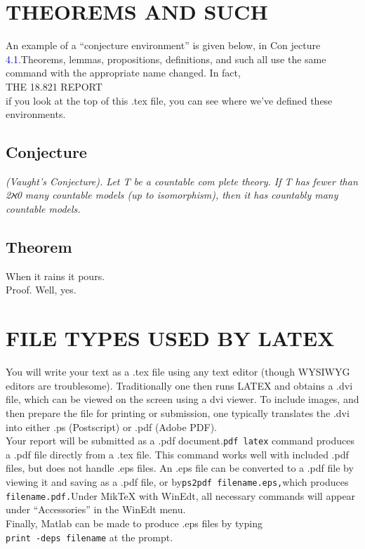 \documentclass{article}
\begin{document}
	\section{\small THEOREMS AND SUCH}
	An example of a “conjecture environment” is given below, in Con­
	jecture \textcolor{blue}{4.1}.Theorems, lemmas, propositions, deﬁnitions, and such all
	use the same command with the appropriate name changed. In fact,
	\centering\\
	THE 18.821 REPORT\\
	\vspace{0.5cm}
	if you look at the top of this .tex ﬁle, you can see where we’ve deﬁned
	these environments.
	\subsection{Conjecture} \textit{(Vaught’s Conjecture). Let T be a countable com­
		plete theory. If T has fewer than 2ℵ0 many countable models (up to
		isomorphism), then it has countably many countable models.}
	\subsection{Theorem}When it rains it pours.\\
	Proof. Well, yes.
	\section{\small FILE TYPES USED BY LATEX}
	You will write your text as a .tex ﬁle using any text editor (though
	WYSIWYG editors are troublesome). Traditionally one then runs
	LATEX and obtains a .dvi ﬁle, which can be viewed on the screen using a
	dvi viewer. To include images, and then prepare the ﬁle for printing or
	submission, one typically translates the .dvi into either .ps (Postscript)
	or .pdf (Adobe PDF).\\
	Your report will be submitted as a .pdf document.\texttt{pdf latex} command produces a .pdf ﬁle directly from a .tex ﬁle. This command
	works well with included .pdf ﬁles, but does not handle .eps ﬁles.
	An .eps ﬁle can be converted to a .pdf ﬁle by viewing it and saving
	as a .pdf ﬁle, or by\texttt{ps2pdf filename.eps,}which produces \texttt{filename.pdf.}Under MikTeX with WinEdt, all necessary commands
	will appear under “Accessories” in the WinEdt menu.\\
	Finally, Matlab can be made to produce .eps ﬁles by typing\\
	\texttt{print -deps filename} at the prompt.
\end{document}
